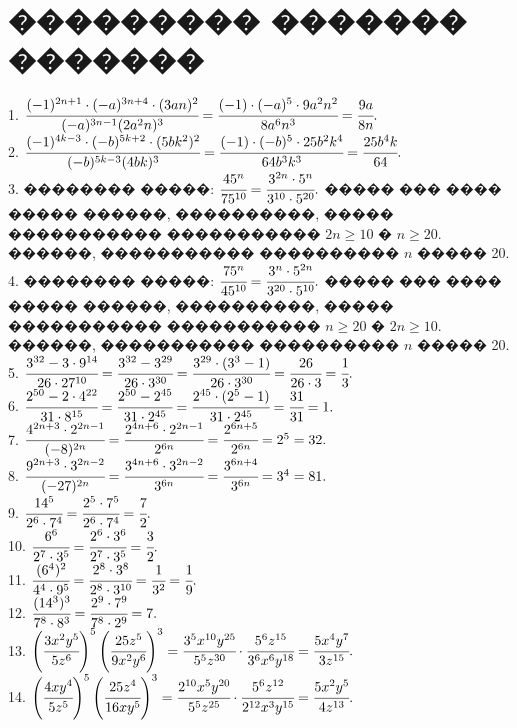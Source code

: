 \documentclass[12pt]{article}
\begin{document}
\section{��������� ������� �������}
1. $\cfrac{(-1)^{2n+1}\cdot(-a)^{3n+4}\cdot(3an)^2}{(-a)^{3n-1}(2a^2n)^3}=
\cfrac{(-1)\cdot(-a)^{5}\cdot9a^2n^2}{8a^6n^3}=\cfrac{9a}{8n}.$\\
2. $\cfrac{(-1)^{4k-3}\cdot(-b)^{5k+2}\cdot(5bk^2)^2}{(-b)^{5k-3}(4bk)^3}=
\cfrac{(-1)\cdot(-b)^{5}\cdot25b^2k^4}{64b^3k^3}=\cfrac{25b^4k}{64}.$\\
3. �������� �����: $\cfrac{45^n}{75^{10}}=\cfrac{3^{2n}\cdot5^n}{3^{10}\cdot5^{20}}.$ ����� ��� ���� ����� ������, ����������, ����� ����������� ����������� $2n\geqslant10$ � $n\geqslant20.$ ������, ����������� ���������� $n$ ����� 20.\\
4. �������� �����: $\cfrac{75^n}{45^{10}}=\cfrac{3^{n}\cdot5^{2n}}{3^{20}\cdot5^{10}}.$ ����� ��� ���� ����� ������, ����������, ����� ����������� ����������� $n\geqslant20$ � $2n\geqslant10.$ ������, ����������� ���������� $n$ ����� 20.\\
5. $\cfrac{3^{32}-3\cdot 9^{14}}{26\cdot27^{10}}=\cfrac{3^{32}-3^{29}}{26\cdot3^{30}}=\cfrac{3^{29}\cdot(3^3-1)}{26\cdot3^{30}}=\cfrac{26}{26\cdot3}=\cfrac{1}{3}.$\\
6. $\cfrac{2^{50}-2\cdot4^{22}}{31\cdot8^{15}}=\cfrac{2^{50}-2^{45}}{31\cdot2^{45}}=\cfrac{2^{45}\cdot(2^5-1)}{31\cdot2^{45}}=\cfrac{31}{31}=1.$\\
7. $\cfrac{4^{2n+3}\cdot 2^{2n-1}}{(-8)^{2n}}=\cfrac{2^{4n+6}\cdot 2^{2n-1}}{2^{6n}}=\cfrac{2^{6n+5}}{2^{6n}}=2^5=32.$\\
8. $\cfrac{9^{2n+3}\cdot3^{2n-2}}{(-27)^{2n}}=\cfrac{3^{4n+6}\cdot3^{2n-2}}{3^{6n}}=\cfrac{3^{6n+4}}{3^{6n}}=3^4=81.$\\
9. $\cfrac{14^5}{2^6\cdot 7^4}=\cfrac{2^5\cdot7^5}{2^6\cdot 7^4}=\cfrac{7}{2}.$\\
10. $\cfrac{6^6}{2^7\cdot 3^5}=\cfrac{2^6\cdot3^6}{2^7\cdot 3^5}=\cfrac{3}{2}.$\\
11. $\cfrac{(6^4)^2}{4^4\cdot9^5}=\cfrac{2^8\cdot3^8}{2^8\cdot3^{10}}=\cfrac{1}{3^2}=\cfrac{1}{9}.$\\
12. $\cfrac{(14^3)^3}{7^8\cdot8^3}=\cfrac{2^9\cdot7^9}{7^8\cdot2^9}=7.$\\
13. $\left(\cfrac{3x^2y^5}{5z^6}\right)^5\left(\cfrac{25z^5}{9x^2y^6}\right)^3=\cfrac{3^5x^{10}y^{25}}{5^5z^{30}}\cdot\cfrac{5^6z^{15}}{3^6x^6y^{18}}=\cfrac{5x^4y^7}{3z^{15}}.$\\
14. $\left(\cfrac{4xy^4}{5z^5}\right)^5\left(\cfrac{25z^4}{16xy^5}\right)^3=\cfrac{2^{10}x^5y^{20}}{5^5z^{25}}\cdot\cfrac{5^6z^{12}}{2^{12}x^3y^{15}}=\cfrac{5x^2y^5}{4z^{13}}.$\\
\end{document}
